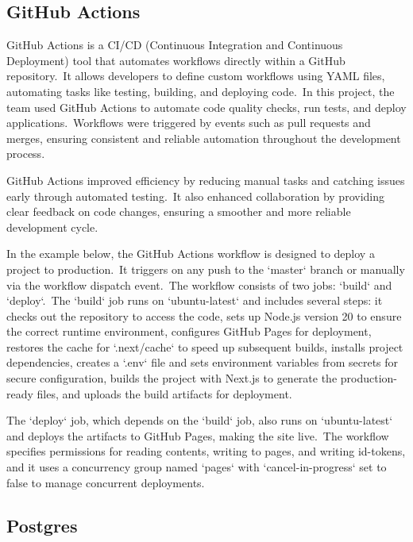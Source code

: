 \subsection{GitHub Actions}\label{subsec:github-actions}

GitHub Actions is a CI/CD (Continuous Integration and Continuous Deployment) tool that automates workflows directly within a GitHub repository.\ It allows developers to define custom workflows using YAML files, automating tasks like testing, building, and deploying code.\ In this project, the team used GitHub Actions to automate code quality checks, run tests, and deploy applications.\ Workflows were triggered by events such as pull requests and merges, ensuring consistent and reliable automation throughout the development process.\cite[GitHub Actions]{githubActions}

GitHub Actions improved efficiency by reducing manual tasks and catching issues early through automated testing.\ It also enhanced collaboration by providing clear feedback on code changes, ensuring a smoother and more reliable development cycle.

In the example below, the GitHub Actions workflow is designed to deploy a project to production.\ It triggers on any push to the `master` branch or manually via the workflow dispatch event.\ The workflow consists of two jobs: `build` and `deploy`.\ The `build` job runs on `ubuntu-latest` and includes several steps: it checks out the repository to access the code, sets up Node.js version 20 to ensure the correct runtime environment, configures GitHub Pages for deployment, restores the cache for `.next/cache` to speed up subsequent builds, installs project dependencies, creates a `.env` file and sets environment variables from secrets for secure configuration, builds the project with Next.js to generate the production-ready files, and uploads the build artifacts for deployment.

The `deploy` job, which depends on the `build` job, also runs on `ubuntu-latest` and deploys the artifacts to GitHub Pages, making the site live.\ The workflow specifies permissions for reading contents, writing to pages, and writing id-tokens, and it uses a concurrency group named `pages` with `cancel-in-progress` set to false to manage concurrent deployments.



\subsection{Postgres}\label{subsec:postgres}

